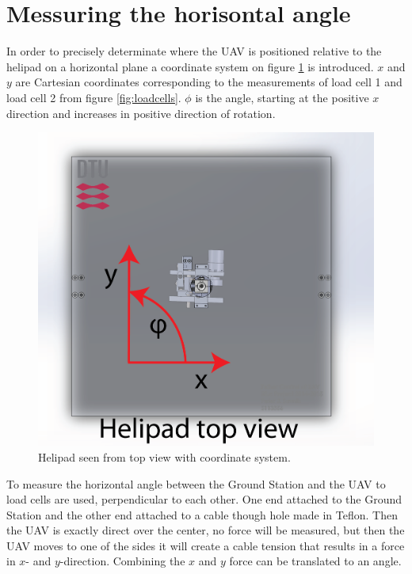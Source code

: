 \section{Messuring the horisontal angle}
\label{sec:horizontalAnglePrototype}
In order to precisely determinate where the UAV is positioned relative to the helipad on a horizontal plane a coordinate system on figure \ref{fig:top-coordinates} is introduced. $x$ and $y$ are Cartesian coordinates corresponding to the measurements of load cell 1 and load cell 2 from figure \ref{fig:loadcells}. $\phi$ is the angle, starting at the positive $x$ direction and increases in positive direction of rotation.

\begin{figure}[hbtp]
\centering
\includegraphics[scale=0.6]{graphics/cad/top-coordinates.png}
\caption{Helipad seen from top view with coordinate system.}
\label{fig:top-coordinates}
\end{figure}

\noindent
To measure the horizontal angle between the Ground Station and the UAV to load cells are used, perpendicular to each other. One end attached to the Ground Station and the other end attached to a cable though hole made in Teflon. Then the UAV is exactly direct over the center, no force will be measured, but then the UAV moves to one of the sides it will create a cable tension that results in a force in $x$- and $y$-direction. Combining the $x$ and $y$ force can be translated to an angle. 

